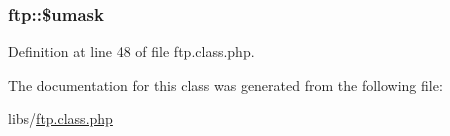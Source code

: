 \hypertarget{classftp_a40322387fc5aa5074daf7aaa4b7aa742}{
\subsubsection[{\$umask}]{\setlength{\rightskip}{0pt plus 5cm}ftp\-::\$umask}}\label{classftp_a40322387fc5aa5074daf7aaa4b7aa742}


Definition at line 48 of file ftp.\-class.\-php.



The documentation for this class was generated from the following file\-:\begin{DoxyCompactItemize}
\item 
libs/\hyperlink{ftp_8class_8php}{ftp.\-class.\-php}\end{DoxyCompactItemize}

